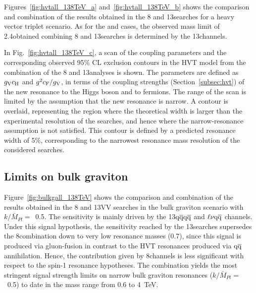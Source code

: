 Figures~\ref{fig:hvtall_138TeV_a} and~\ref{fig:hvtall_138TeV_b} shows the comparison and combination of the results obtained in the 8 and 13\TeV searches for a heavy vector triplet scenario.
As for the \Wpr and \Zpr cases, the observed mass limit of 2.4\TeV obtained combining 8 and 13\TeV searches is determined by the 13\TeV channels.

In Fig.~\ref{fig:hvtall_138TeV_c}, a scan of the coupling parameters and the corresponding observed 95\% CL exclusion contours in the HVT model from the combination of the 8 and 13\TeV analyses is shown. The parameters are defined as $g_{\rm V}c_{\rm H}$ and $g^2c_{\rm F}/g_{\rm V}$, in terms of the coupling strengths (Section~\ref{subsec:hvt}) of the new resonance to the Higgs boson and to fermions. The range of the scan is limited by the assumption that the new resonance is narrow. A contour is overlaid, representing the region where the theoretical width is larger than the experimental resolution of the searches, and hence where the narrow-resonance assumption is not satisfied. This contour is defined by a predicted resonance width of 5\%, corresponding to the narrowest resonance mass resolution of the considered searches.

\subsection{Limits on bulk graviton}

Figure~\ref{fig:bulkgall_138TeV} shows the comparison and combination of the results obtained in the 8 and 13\TeV VV searches in the bulk graviton scenario with $k/\bar{M}_{Pl}=$~0.5.
The sensitivity is mainly driven by the 13\TeV $\mathrm{q}\overline{\mathrm{q}} \mathrm{q}\overline{\mathrm{q}}$ and $\ell \nu \mathrm{q}\overline{\mathrm{q}}$ channels.
Under this signal hypothesis, the sensitivity reached by the 13\TeV searches supersedes the 8\TeV combination down to very low resonance masses (0.7\TeV), since this signal is produced via gluon-fusion in contrast to the HVT resonances produced via $\mathrm{q}\overline{\mathrm{q}}$ annihilation.
Hence, the contribution given by 8\TeV channels is less significant with respect to the spin-1 resonance hypotheses.
The combination yields the most stringent signal strength limits on narrow bulk graviton resonances ($k/\bar{M}_{Pl}=$~0.5) to date in the mass range from 0.6 to 4~TeV.

